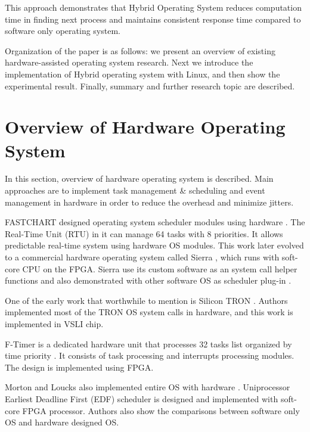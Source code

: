 \documentclass[10pt,a4paper]{article}
\begin{document}
\begin{multicols}{2}
This approach demonstrates that Hybrid Operating System reduces computation time in finding next process and maintains consistent response time compared to software only operating system.


Organization of the paper is as follows: we present an overview of existing hardware-assisted operating system research. Next we introduce the implementation of Hybrid operating system with Linux, and then show the experimental result. Finally, summary and further research topic are described.

\section{Overview of Hardware Operating System}

In this section, overview of hardware operating system is described. Main approaches are to implement task management \& scheduling and event management in hardware in order to reduce the overhead and minimize jitters.

FASTCHART designed operating system scheduler modules using hardware \cite{fastchart}. The Real-Time Unit (RTU) in it can manage 64 tasks with 8 priorities. It allows predictable real-time system using hardware OS modules. This work later evolved to a commercial hardware operating system called Sierra \cite{sierra}, which runs with soft-core CPU on the FPGA. Sierra use its custom software as an system call helper functions and also demonstrated with other software OS as scheduler plug-in \cite{susan_soc2007}.

One of the early work that worthwhile to mention is Silicon TRON \cite{tron_1995}. Authors implemented most of the TRON OS system calls in hardware, and this work is implemented in VSLI chip.

F-Timer is a dedicated hardware unit that processes 32 tasks list organized by time priority \cite{f-timer}. It consists of task processing and interrupts processing modules. The design is implemented using FPGA.

Morton and Loucks also implemented entire OS with hardware \cite{andrew_2004}. Uniprocessor Earliest Deadline First (EDF) scheduler is designed and implemented with soft-core FPGA processor. Authors also show the comparisons between software only OS and hardware designed OS.


\end{multicols}
\end{document}
